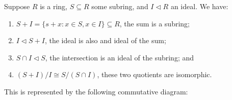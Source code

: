\begin{theorem}\label{thm:iso-2-ring}
    Suppose \(R\) is a ring, \(S \subseteq R\) some subring,
    and \(I \lhd R\) an ideal.
    We have:
    \begin{enumerate}[label={(\alph*)}, itemsep=0mm]
        \item \(S + I = \{s+x : x \in S, x \in I\} \subseteq R\),
            the sum is a subring;
        \item \(I \lhd S + I\), the ideal is also and ideal of the sum;
        \item \(S \cap I \lhd S\),
            the intersection is an ideal of the subring; and
        \item \((S+I)/I \cong S/(S \cap I)\),
            these two quotients are isomorphic.
    \end{enumerate}

    This is represented by the following commutative diagram:
    \begin{center}
    \end{center}
\end{theorem}
